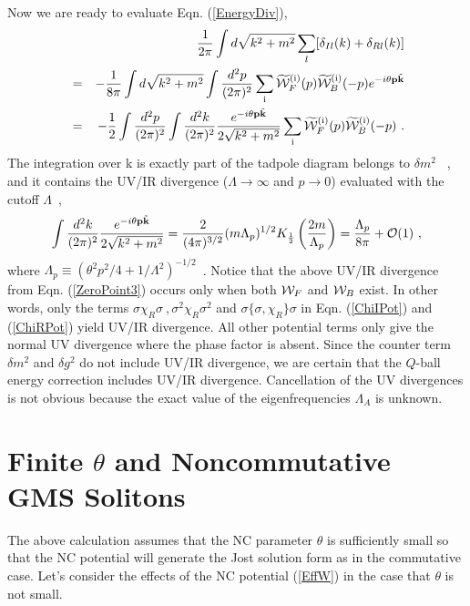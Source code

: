 \documentclass[a4paper,a4paper]{article}
\def\cW{{\cal W}}
\def\bp{{\bf p}}
\def\bk{{{\bf k}}}
\def\tbk{{\tilde{\bk}}}
\def\rmi{{\rm i}}
\begin{document}
Now we are ready to evaluate Eqn. (\ref{EnergyDiv}), 
\begin{eqnarray}
  &&\frac 1{2\pi}\int d\sqrt{k^2+m^2}\sum_l[\delta_{Il}(k)+\delta_{Rl}(k)] \nonumber \\
  &=&-\frac 1{8\pi}\int  d\sqrt{k^2+m^2} 
\int \frac{d^2p}{(2\pi)^2}\sum_\rmi\widetilde{\cW}^{(\rmi)}_F(p)
\widetilde{\cW}^{(\rmi)}_B(-p)e^{-i\theta \bp\tbk}\nonumber\\
&=&-\frac 12\int \frac{d^2p}{(2\pi)^2}\int \frac{d^2k}{(2\pi)^2}
\frac{e^{-i\theta \bp\tbk}}{2\sqrt{k^2+m^2}}
\sum_\rmi\widetilde{\cW}^{(\rmi)}_F(p)\widetilde{\cW}^{(\rmi)}_B(-p)\ .                            \label{ZeroPoint3}
\end{eqnarray}
The integration over k is exactly part of the tadpole diagram belongs to $\delta m^2$
~\cite{Kos}, and it contains the UV/IR divergence ($\Lambda\rightarrow \infty$ and 
$p\rightarrow 0$) evaluated with the cutoff $\Lambda$~\cite{MRS}, 
\begin{equation}
  \int \frac{d^2k}{(2\pi)^2}\frac{e^{-i\theta \bp\tbk}}{2\sqrt{k^2+m^2}}=
\frac 2{(4\pi)^{3/2}}(m\Lambda_{p})^{1/2}K_{\frac 12}\left(\frac{2m}
{\Lambda_{p}}\right)=\frac{\Lambda_{p}}{8\pi}+{\cal O}(1)\ ,                                     \label{UVIR}
\end{equation}
where $\Lambda_{p}\equiv(\theta^2p^2/4+1/\Lambda^2)^{-1/2}$\ .
Notice that the above UV/IR divergence from Eqn. (\ref{ZeroPoint3}) occurs 
only when both $\cW_F$ and $\cW_B$ exist. In other words, only the 
terms $\sigma\chi_R\sigma\ ,\sigma^2\chi_R\sigma^2$ and $\sigma\{\sigma,\chi_R\}\sigma$ 
in Eqn. (\ref{ChiIPot}) and (\ref{ChiRPot}) yield UV/IR divergence. 
All other potential terms only give the normal UV divergence where the phase 
factor is absent. Since the counter term $\delta m^2$ and $\delta g^2$ do not 
include UV/IR divergence, we are certain that the $Q$-ball energy 
correction includes UV/IR 
divergence. Cancellation of the UV divergences is not obvious 
because the exact value of the eigenfrequencies $\Lambda_A$ is unknown. 

\section{Finite $\theta$ and Noncommutative GMS Solitons}
The above calculation assumes that the NC parameter $\theta$ is sufficiently 
small so that the NC potential will generate the Jost solution form as 
in the commutative case. 
Let's consider the effects of the NC potential (\ref{EffW}) 
in the case that $\theta$ is not small. 
\end{document}
